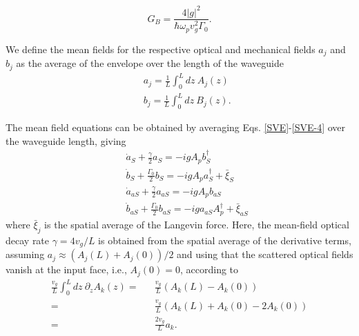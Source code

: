 \begin{equation}
\label{eq:GB}
    G_B = \frac{4 |g|^2}{\hbar \omega_p v_g^2 \Gamma_0}.
\end{equation}

We define the mean fields for the respective optical and mechanical fields $a_j$ and $b_j$  as the average of the envelope over the length of the waveguide
\begin{eqnarray}
&&  a_j = \frac{1}{L}\int_0^L dz \ A_j(z)
\\
&&  b_j = \frac{1}{L}\int_0^L dz \ B_j(z).
\end{eqnarray}

 The mean field equations can be obtained by averaging Eqs. \eqref{SVE}-\eqref{SVE-4} over the waveguide length, giving
\begin{eqnarray}
\label{eq:mean-field}
   && \dot{a}_S + \frac{\gamma}{2}a_S = -i g A_p b_S^\dag \\
   \label{eq:mean-field-2}
   && \dot{b}_S + \frac{\Gamma_0}{2} b_S  = -i g A_p a_S^\dag + \bar{\xi}_S \\
   && \dot{a}_{aS} + \frac{\gamma}{2} a_{aS} = -i g A_p b_{aS} \\
   \label{eq:mean-field-4}
   && \dot{b}_{aS} + \frac{\Gamma_0}{2} b_{aS}  = -i g a_{aS} A_p^\dag + \bar{\xi}_{aS}
\end{eqnarray}
where $\bar{\xi}_j$ is the spatial average of the Langevin force. Here, the mean-field optical decay rate $\gamma = 4 v_g/L$ is obtained from the spatial average of the derivative terms, assuming $a_j \approx (A_j(L)+A_j(0))/2$ and using that the scattered optical fields vanish at the input face, i.e., $A_j(0) = 0$, according to
\begin{eqnarray}
    \frac{v_g}{L} \int_0^L dz  \ \partial_z A_k(z)  = && \frac{v_g}{L}(A_k(L)-A_k(0)) \nonumber
   \\
    = && \frac{v_g}{L}(A_k(L)+ A_k(0)-2A_k(0))  \nonumber
   \\
    = && \frac{2v_g}{L}a_k.
\end{eqnarray}

